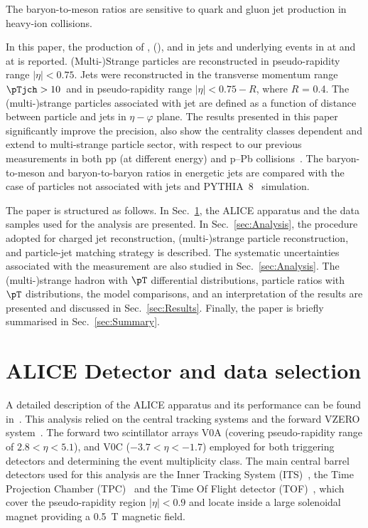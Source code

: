 \documentclass[ALICE,manyauthors]{cernphprep}
\begin{document}
The baryon-to-meson ratios are sensitive to quark and gluon jet production in heavy-ion collisions.

In this paper, the production of \kzero, \lmb (\almb), \Xis and \Oms in jets and underlying events in \pp at \thirteen and \pPb at \fivenn is reported.
(Multi-)Strange particles are reconstructed in pseudo-rapidity range $|\eta| < 0.75$.
Jets were reconstructed in the transverse momentum range $\pTjch > 10$~\GeVc and in pseudo-rapidity range $|\eta| < 0.75 - R$, where $R$ = 0.4.
The (multi-)strange particles associated with jet are defined as a function of distance between particle and jets in $\eta-\varphi$ plane.
The results presented in this paper significantly improve the precision, also show the centrality classes dependent and extend to multi-strange particle sector, with respect to our previous measurements in both pp (at different energy) and p–Pb collisions~\cite{Acharya:2021oaa}.
The baryon-to-meson and baryon-to-baryon ratios in energetic jets are compared with the case of particles not associated with jets and PYTHIA~8~\cite{Sjostrand:2014zea} simulation.

The paper is structured as follows.
In Sec.~\ref{sec:Detector}, the ALICE apparatus and the data samples used for the analysis are presented. In Sec.~\ref{sec:Analysis}, the procedure adopted for charged jet reconstruction, (multi-)strange particle reconstruction, and particle-jet matching strategy is described.
The systematic uncertainties associated with the measurement are also studied in Sec.~\ref{sec:Analysis}.
The (multi-)strange hadron with $\pT$ differential distributions, particle ratios with $\pT$ distributions, the model comparisons, and an interpretation of the results are presented and discussed in Sec.~\ref{sec:Results}. Finally, the paper is briefly summarised in Sec.~\ref{sec:Summary}. 

\section{ALICE Detector and data selection}%
\label{sec:Detector}

A detailed description of the ALICE apparatus and its performance can be found in~\cite{Collaboration_2008, Abelev:2014ffa}.
This analysis relied on the central tracking systems and the forward VZERO system~\cite{Abbas:2013taa}.
The forward two scintillator arrays V0A (covering pseudo-rapidity range of $2.8 < \eta < 5.1$), and V0C ($-3.7 < \eta < -1.7$) employed for both triggering detectors and determining the event multiplicity class.
The main central barrel detectors used for this analysis are the Inner Tracking System (ITS)~\cite{Aamodt:2010aa}, the Time Projection Chamber (TPC)~\cite{Alme:2010ke} and the Time Of Flight detector (TOF)~\cite{Akindinov:2004cj, Akindinov:2009zze, Akindinov:2010zzb, Carnesecchi:2018oss}, which cover the pseudo-rapidity region $|\eta| < 0.9$ and locate inside a large solenoidal magnet providing a 0.5~T magnetic field.
\end{document}
